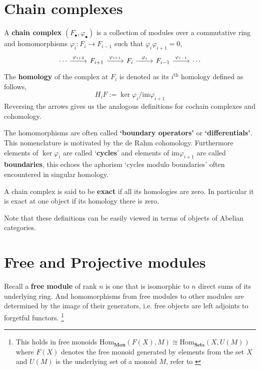 \documentclass[12pt]{article}
\numberwithin{equation}{section}
\begin{document}
	\section{Chain complexes}
	A \textbf{chain complex} $(F_\bullet, \varphi_\bullet)$ is a collection of modules over a commutative ring and homomorphisms $\varphi_i: F_i \to F_{i-1}$ such that $\varphi_i \varphi_{i+1}=0$,
\[\begin{tikzcd}
	\cdots & {F_{i+1}} & {F_i} & {F_{i-1}} & \cdots
	\arrow["{\varphi_{i+1}}", from=1-2, to=1-3]
	\arrow["{\varphi_i}", from=1-3, to=1-4]
	\arrow["{\varphi_{i-1}}", from=1-4, to=1-5]
	\arrow["{\varphi_{i+2}}", from=1-1, to=1-2]
\end{tikzcd}\]
	The \textbf{homology} of the complex at $F_i$ is denoted as its $i^{\mathrm{th}}$ homology defined as follows,
	\[ H_iF := \ker \varphi_i/ \mathrm{im} \varphi_{i+1} \]
	Reversing the arrows gives us the analogous definitions for cochain complexes and cohomology.
	
	The homomorphisms are often called \textbf{`boundary operators'} or \textbf{`differentials'}. This nomenclature is motivated by the de Rahm cohomology. Furthermore elements of $\ker \varphi_i$ are called `\textbf{cycles}' and elements of $\mathrm{im} \varphi_{i+1}$ are called \textbf{boundaries}, this echoes the aphorism `cycles modulo boundaries' often encountered in singular homology.
	
	A chain complex is said to be \textbf{exact} if all its homologies are zero. In particular it is exact at one object if its homology there is zero.
	
	Note that these definitions can be easily viewed in terms of objects of Abelian categories.
	
	\section{Free and Projective modules}
	Recall a\textbf{ free module} of rank $n$ is one that is isomorphic to $n$ direct sums of its underlying ring. And homomorphisms from free modules to other modules are determined by the image of their generators, i.e. free objects are left adjoints to forgetful functors. \footnote{This holds in free monoids $\mathrm{Hom}_\mathbf{Mon}(F(X), M) \cong \mathrm{Hom}_\mathbf{Sets} (X, U(M))$ where $F(X)$ denotes the free monoid generated by elements from the set $X$ and $U(M)$ is the underlying set of a monoid $M$, refer to \cite[p. ~208]{Awodey} }
	
\end{document}
